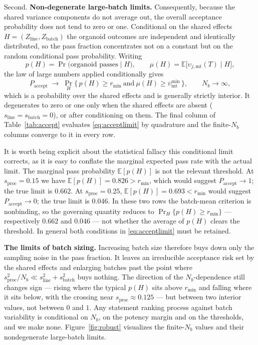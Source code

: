 \documentclass[pdflatex,sn-mathphys-num]{sn-jnl}
\numberwithin{equation}{section}
\theoremstyle{thmstyleone}%
\theoremstyle{definition}
\theoremstyle{remark}
\begin{document}
Second. \textbf{Non-degenerate large-batch limits.} Consequently, because the shared variance components do not average out, the overall acceptance probability does not tend to zero or one. Conditional on the shared effects $H=(Z_{\mathrm{line}},Z_{\mathrm{batch}})$ the organoid outcomes are
independent and identically distributed, so the pass fraction concentrates not
on a constant but on the random conditional pass probability. Writing
\[
p(H)=\Pr\bigl(\text{organoid passes}\mid H\bigr),
\qquad
\mu(H)=\mathbb E\bigl[\upsilon_{j,\mathrm{mt}}(T)\mid H\bigr],
\]
the law of large numbers applied conditionally gives
\begin{equation}
P_{\mathrm{accept}}\;\longrightarrow\;
\Pr_H\bigl\{\,p(H)\ge r_{\min}\ \text{and}\ \mu(H)\ge
\overline\upsilon^{\min}_{\mathrm{mt}}\,\bigr\},
\qquad N_b\to\infty,
\label{eq:acceptlimit}
\end{equation}
which is a probability over the shared effects and is generally strictly
interior. It degenerates to zero or one only when the shared effects are absent
($s_{\mathrm{line}}=s_{\mathrm{batch}}=0$), or after conditioning on them. The
final column of Table~\ref{tab:accept} evaluates \eqref{eq:acceptlimit} by
quadrature and the finite-$N_b$ columns converge to it in every row.

It is worth being explicit about the statistical fallacy this conditional limit corrects, as it is easy to conflate the marginal expected pass rate with the actual limit. The marginal pass probability $\mathbb E[p(H)]$ is not the relevant threshold. At $s_{\mathrm{proc}}=0.15$ we have
$\mathbb E[p(H)]=0.826>r_{\min}$, which would suggest
$P_{\mathrm{accept}}\to1$; the true limit is $0.662$. At
$s_{\mathrm{proc}}=0.25$, $\mathbb E[p(H)]=0.693<r_{\min}$ would suggest
$P_{\mathrm{accept}}\to0$; the true limit is $0.046$. In these two rows the
batch-mean criterion is nonbinding, so the governing quantity reduces to
$\Pr_H\{p(H)\ge r_{\min}\}$ --- respectively $0.662$ and $0.046$ --- not
whether the average of $p(H)$ clears the threshold. In general both conditions
in \eqref{eq:acceptlimit} must be retained.

\medskip
\noindent\textbf{The limits of batch sizing.} Increasing batch size therefore buys down only the sampling noise in the pass fraction. It leaves an irreducible acceptance risk set by the shared effects
and enlarging batches past the point where
$s^2_{\mathrm{proc}}/N_b\ll s^2_{\mathrm{line}}+s^2_{\mathrm{batch}}$ buys
nothing. The direction of the $N_b$-dependence still changes sign --- rising
where the typical $p(H)$ sits above $r_{\min}$ and falling where it sits below,
with the crossing near $s_{\mathrm{proc}}\approx0.125$ --- but between two
interior values, not between $0$ and $1$. Any statement ranking process against
batch variability is conditional on $N_b$, on the potency margin and on the
thresholds, and we make none.
Figure~\ref{fig:robust} visualizes the finite-$N_b$ values
and their nondegenerate large-batch limits.
\end{document}
